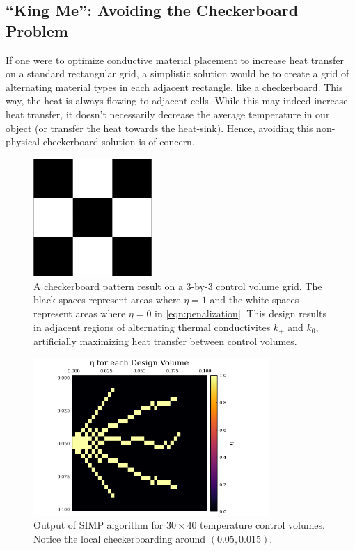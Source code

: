 \subsection{``King Me'': Avoiding the Checkerboard Problem}\label{sec:checkerboarding}

If one were to optimize conductive material placement to increase heat transfer on a standard rectangular grid, a simplistic solution would be to create a grid of alternating material types in each adjacent rectangle, like a checkerboard. This way, the heat is always flowing to adjacent cells. While this may indeed increase heat transfer, it doesn't necessarily decrease the average temperature in our object (or transfer the heat towards the heat-sink). Hence, avoiding this non-physical checkerboard solution is of concern.

\begin{figure}
	\centering
	\includegraphics[width=0.4\textwidth]{Chapter_III_Implementation_and_Results/Images/3x3-Checkerboard.png}
	\caption[Checkerboard Pattern]{A checkerboard pattern result on a 3-by-3 control volume grid. The black spaces represent areas where $\eta=1$ and the white spaces represent areas where $\eta=0$ in \eqref{eqn:penalization}. This design results in adjacent regions of alternating thermal conductivites $k_+$ and $k_0$, artificially maximizing heat transfer between control volumes.}
	\label{fig:3x3-Checkerboard}
\end{figure}

\begin{figure}
	\centering
	\includegraphics[width=0.8\textwidth]{Chapter_III_Implementation_and_Results/Images/SIMP-Example-Checkerboarding.png}
	\caption[Checkerboard Result in Practice]{Output of SIMP algorithm for $30\times 40$ temperature control volumes. Notice the local checkerboarding around $(0.05,0.015)$.}
	\label{fig:SIMP-Checkerboard}
\end{figure}

